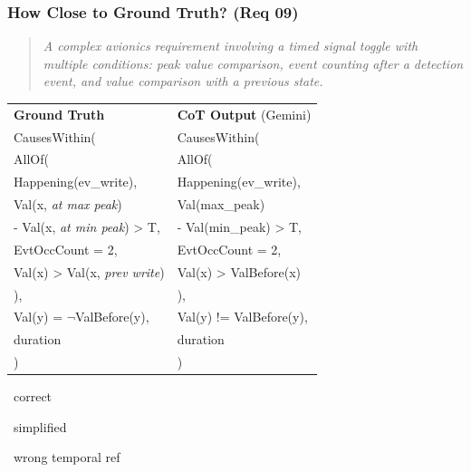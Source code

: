 \begin{frame}
  \frametitle{How Close to Ground Truth? (Req 09)}
  \scriptsize

  \begin{quote}\itshape
  A complex avionics requirement involving a timed signal toggle
  with multiple conditions: peak value comparison, event counting
  after a detection event, and value comparison with a previous state.
  \end{quote}

  \smallskip
  \centering
  \renewcommand{\arraystretch}{1.1}
  \begin{tabular}{@{}l@{\qquad}l@{}}
  \textbf{\small Ground Truth} & \textbf{\small CoT Output} {\scriptsize(Gemini)} \\[4pt]
  \ttfamily\colorbox{green!20}{CausesWithin(} &
  \ttfamily\colorbox{green!20}{CausesWithin(} \\
  \ttfamily\quad\colorbox{green!20}{AllOf(} &
  \ttfamily\quad\colorbox{green!20}{AllOf(} \\
  \ttfamily\quad\quad\colorbox{green!20}{Happening(ev\_write),} &
  \ttfamily\quad\quad\colorbox{green!20}{Happening(ev\_write),} \\
  \ttfamily\quad\quad\colorbox{green!20}{Val(x, \textit{at max peak})} &
  \ttfamily\quad\quad\colorbox{yellow!30}{Val(max\_peak)} \\
  \ttfamily\quad\quad\colorbox{green!20}{\;- Val(x, \textit{at min peak}) > T,} &
  \ttfamily\quad\quad\colorbox{yellow!30}{\;- Val(min\_peak) > T,} \\
  \ttfamily\quad\quad\colorbox{green!20}{EvtOccCount = 2,} &
  \ttfamily\quad\quad\colorbox{green!20}{EvtOccCount = 2,} \\
  \ttfamily\quad\quad\colorbox{red!20}{Val(x) > Val(x, \textit{prev write})} &
  \ttfamily\quad\quad\colorbox{red!20}{Val(x) > ValBefore(x)} \\
  \ttfamily\quad ),  &
  \ttfamily\quad ), \\
  \ttfamily\quad\colorbox{green!20}{Val(y) = $\neg$ValBefore(y),} &
  \ttfamily\quad\colorbox{green!20}{Val(y) != ValBefore(y),} \\
  \ttfamily\quad\colorbox{green!20}{duration} &
  \ttfamily\quad\colorbox{green!20}{duration} \\
  \ttfamily ) & \ttfamily ) \\
  \end{tabular}

  \smallskip
  \colorbox{green!20}{\small\strut\ correct\ }\quad
  \colorbox{yellow!30}{\small\strut\ simplified\ }\quad
  \colorbox{red!20}{\small\strut\ wrong temporal ref\ }


\end{frame}
